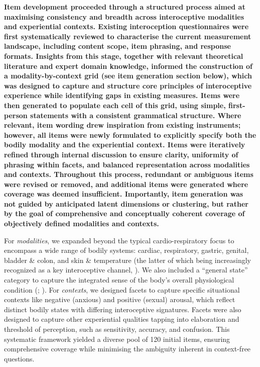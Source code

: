 \documentclass[
  man,
  floatsintext,
  longtable,
  nolmodern,
  notxfonts,
  notimes,
  mask,
  colorlinks=true,linkcolor=blue,citecolor=blue,urlcolor=blue]{apa7}
\begin{document}
\textbf{Item development proceeded through a structured process aimed at
maximising consistency and breadth across interoceptive modalities and
experiential contexts. Existing interoception questionnaires were first
systematically reviewed to characterise the current measurement
landscape, including content scope, item phrasing, and response formats.
Insights from this stage, together with relevant theoretical literature
and expert domain knowledge, informed the construction of a
modality-by-context grid (see item generation section below), which was
designed to capture and structure core principles of interoceptive
experience while identifying gaps in existing measures. Items were then
generated to populate each cell of this grid, using simple, first-person
statements with a consistent grammatical structure. Where relevant, item
wording drew inspiration from existing instruments; however, all items
were newly formulated to explicitly specify both the bodily modality and
the experiential context. Items were iteratively refined through
internal discussion to ensure clarity, uniformity of phrasing within
facets, and balanced representation across modalities and contexts.
Throughout this process, redundant or ambiguous items were revised or
removed, and additional items were generated where coverage was deemed
insufficient. Importantly, item generation was not guided by anticipated
latent dimensions or clustering, but rather by the goal of comprehensive
and conceptually coherent coverage of objectively defined modalities and
contexts.}

For \emph{modalities}, we expanded beyond the typical cardio-respiratory
focus to encompass a wide range of bodily systems: cardiac, respiratory,
gastric, genital, bladder \& colon, and skin \& temperature (the latter
of which being increasingly recognized as a key interoceptive channel,
). We
also included a ``general state'' category to capture the integrated
sense of the body's overall physiological condition
(;
). For
\emph{contexts}, we designed facets to capture specific situational
contexts like negative (anxious) and positive (sexual) arousal, which
reflect distinct bodily states with differing interoceptive signatures.
Facets were also designed to capture other experiential qualities
tapping into elaboration and threshold of perception, such as
sensitivity, accuracy, and confusion. This systematic framework yielded
a diverse pool of 120 initial items, ensuring comprehensive coverage
while minimising the ambiguity inherent in context-free questions.
\end{document}
